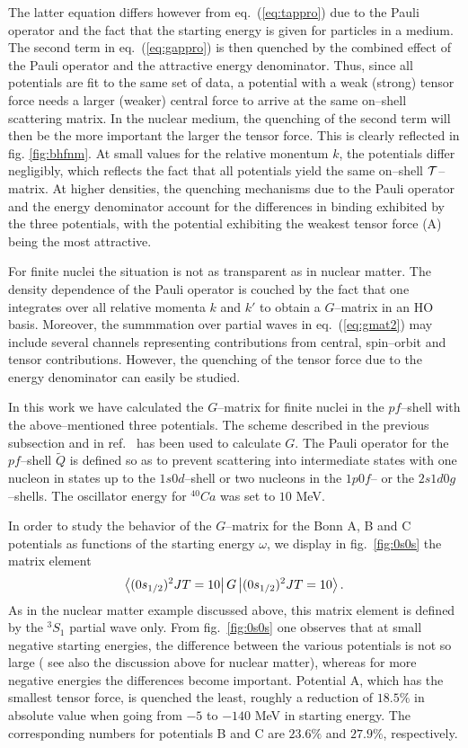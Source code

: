 The latter equation differs however from eq.\ (\ref{eq:tappro}) due to the
Pauli operator and the fact that the starting energy is given for particles
in a medium. The second term in eq.\ (\ref{eq:gappro}) is then quenched
by the combined effect of the Pauli operator and the attractive energy
denominator. Thus, since all potentials are fit to the same set of data,
a potential with a weak (strong) tensor force needs a larger (weaker)
central force to arrive at the same on--shell scattering matrix. In the
nuclear medium, the quenching of the second term will then be the more
important the larger the tensor force. This is clearly reflected in fig.
\ref{fig:bhfnm}. At small values for the relative monentum $k$, the
potentials differ negligibly, which reflects the fact that all potentials
yield the same on--shell  ${\cal T}$--matrix. At higher densities, the
quenching mechanisms due to the Pauli operator and the energy denominator
account for the differences in binding exhibited by the three potentials,
with the potential exhibiting the weakest tensor force (A) being the most
attractive.

For finite nuclei the situation is not as transparent as in nuclear
matter. The density dependence of the Pauli operator is couched by the
fact that one integrates over all relative momenta $k$ and $k'$ to
obtain a $G$--matrix in an HO basis. Moreover, the summmation
over partial waves in eq.\ (\ref{eq:gmat2}) may include several
channels representing contributions from central, spin--orbit and tensor
contributions. However, the quenching of the tensor force due to the
energy denominator can easily be studied.

In this work we have calculated the $G$--matrix for finite nuclei
in the $pf$--shell with the
above--mentioned three potentials. The scheme described in the previous
subsection and in ref.\ \cite{kkko76} has been used to calculate $G$.
The Pauli operator for the $pf$--shell $\tilde{Q}$ is
defined so as to prevent scattering into intermediate states
with one nucleon in states up to the $1s0d$--shell or two nucleons
in the $1p0f$-- or the $2s1d0g$--shells. The oscillator energy
for $^{40}Ca$ was set to $10$ MeV.

In order to study the behavior of the $G$--matrix for the Bonn A, B and C
potentials as functions of the starting energy $\omega$, we display
in fig.\ \ref{fig:0s0s} the matrix element
\[
\left\langle (0s_{1/2})^{2}JT=10 \right|G\left| (0s_{1/2})^{2}JT=10 \right\rangle.
\]
As in the nuclear matter example discussed above, 
this matrix element is defined by the $^{3}S_1$
partial wave only.
From fig.\ \ref{fig:0s0s} one observes
that at small negative starting energies, the difference between the various
potentials is not so large ( see also the discussion above for nuclear
matter), whereas for more negative energies the differences become important.
Potential A, which has the smallest tensor force, is quenched the least,
roughly a reduction of $18.5\%$ in absolute value when going from $-5$ to $-140$ MeV
in starting energy. The corresponding numbers for potentials B and C are
$23.6\%$ and $27.9\%$,
respectively.

